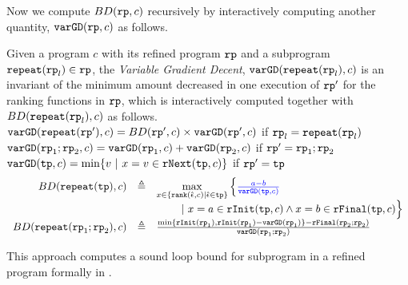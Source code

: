 Now we compute $BD(\mathtt{rp}, c)$ recursively by interactively computing another quantity, $\mathtt{varGD}(\mathtt{rp}, c)$ as follows.
\begin{defn}
\label{def:loopbound}
Given a program $c$ with its refined program $\mathtt{rp}$ and a subprogram $\mathtt{repeat}(\mathtt{rp}_l) \in \mathtt{rp}$,
the \emph{Variable Gradient Decent}, 
 $\mathtt{varGD}(\mathtt{repeat}(\mathtt{rp}_l), c)$ is an invariant of the minimum amount decreased in one execution of $\mathtt{rp}'$ for the ranking functions in $\mathtt{rp}$, which is interactively computed together with $BD(\mathtt{repeat}(\mathtt{rp}_l), c)$ as follows.
 \\
 {$\mathtt{varGD}(\mathtt{repeat}(\mathtt{rp}'), c) =  BD(\mathtt{rp}', c)  \times
{\ensuremath{\mathtt{varGD}}(\ensuremath{\mathtt{rp}}', c)}$} if $\mathtt{rp}_l = \mathtt{repeat}(\mathtt{rp}_l)$
 \\
 $\mathtt{varGD}(\mathtt{rp}_1;\mathtt{rp}_2, c) =  \mathtt{varGD}(\mathtt{rp}_1, c) + \mathtt{varGD}(\mathtt{rp}_2, c)$ if $\mathtt{rp}' = \mathtt{rp}_1;\mathtt{rp}_2$
 \\
 $\varGD(\tpath, c) =  \min\left\{v  ~|~ x = v \in \rfnext(\tpath, c) \right\}  $  if $\mathtt{rp}' = \mathtt{tp}$
{\small
\[
  \begin{array}{rcl}
    BD(\rprepeat(\tpath), c) & \triangleq &  \max\limits_{x \in \left\{ \locbound(\absevent, c) | \absevent \in \tpath \right\}}
    \Big\{ \highlight{\frac{a - b}{\varGD(\tpath, c)}} 
    \\ & & \qquad 
    ~\vert~
    x = a \in \rfinit(\tpath, c)
    \land x = b \in \rffinal(\tpath, c)
    \Big\} 
    \\
    BD(\rprepeat(\rprog_1;\rprog_2), c) & \triangleq & 
    \frac{\min\{ \rfinit(\rprog_1), \rfinit(\rprog_1) - \varGD(\rprog_1) \} - \rffinal(\rprog_2;\rprog_2)}{ 
    \varGD(\rprog_1;\rprog_2)} 
  \end{array}
\]
}
\end{defn}
This approach computes a sound loop bound for subprogram in a refined program formally in .
